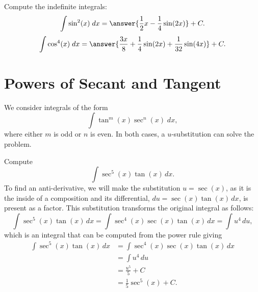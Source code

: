 \documentclass{ximera}
\begin{document}
\begin{problem}
Compute the indefinite integrals:
\[
\int \sin^2(x) \; dx = \answer{\frac12 x - \frac14 \sin(2x)} + C.
\]
\[
\int \cos^4(x) \; dx = \answer{\frac{3x}{8} +\frac14 \sin(2x) + \frac{1}{32}\sin(4x)} + C.
\]
\end{problem}

\section{Powers of Secant and Tangent}
We consider integrals of the form
\[
\int \tan^m(x)\sec^n(x) \; dx,
\]
where either $m$ is odd or $n$ is even. In both cases, a $u$-substitution
can solve the problem. 


\begin{example}

Compute
\[
\int \sec^5(x) \tan(x) \, dx.
\]
To find an anti-derivative, we will make the substitution $u = \sec(x)$, as it is the inside of a composition
and its differential, $du = \sec(x)\tan(x) \, dx$, is present as a factor. 
This substitution transforms the original integral as follows:
\[
\int \sec^5(x) \tan(x) \, dx = \int \sec^4(x) \sec(x) \tan(x) \, dx= \int u^4 \, du,
\]
which is an integral that can be computed from the power rule giving
\begin{align*}
\int \sec^5(x) \tan(x) \, dx &= \int \sec^4(x) \sec(x) \tan(x) \, dx\\
                             &= \int u^4 \, du\\
                             &= \frac{u^5}{5} + C\\
                             &= \frac15 \sec^5(x) + C.
\end{align*}

\end{example}
\end{document}
